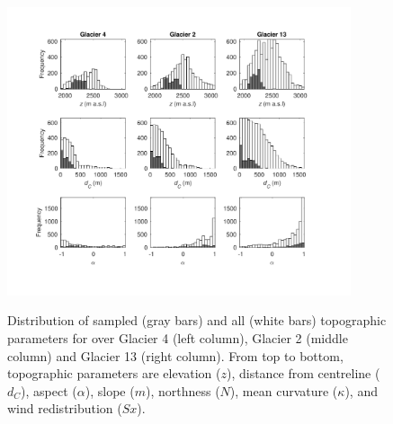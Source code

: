 \documentclass[onecolumn, letterpaper]{igs}
\renewcommand{\thefigure}{S\arabic{figure}}
\begin{document}
\begin{figure}[b]
	\centering
	\includegraphics[width =0.9\textwidth]{TopoParamsSampled1.pdf}\\
	\caption{Distribution of sampled (gray bars) and all (white bars) topographic parameters for over Glacier 4 (left column), Glacier 2 (middle column) and Glacier 13 (right column). From top to bottom, topographic parameters are elevation ($z$), distance from centreline ($d_C$), aspect ($\alpha$), slope ($m$), northness ($N$), mean curvature ($\kappa$), and wind redistribution ($Sx$).}
	\label{fig:TopoParamsSampled1}
\end{figure}

\renewcommand{\thefigure}{S\arabic{figure} (Cont.)}
\addtocounter{figure}{-1}
\end{document}
